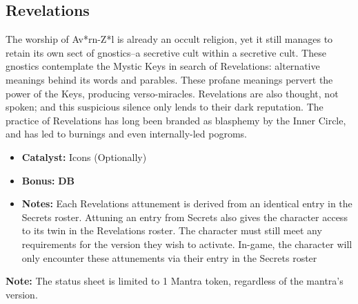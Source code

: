 \subsection{Revelations}
The worship of Av*rn-Z*l is already an occult religion, yet it still manages to retain its own sect of gnostics--a secretive cult within a secretive cult. These gnostics contemplate the Mystic Keys in search of Revelations: alternative meanings behind its words and parables. These profane meanings pervert the power of the Keys, producing verso-miracles. Revelations are also thought, not spoken; and this suspicious silence only lends to their dark reputation. The practice of Revelations has long been branded as blasphemy by the Inner Circle, and has led to burnings and even internally-led pogroms.

\begin{itemize}
\item \textbf{Catalyst:} Icons (Optionally)
\item \textbf{Bonus:} \textbf{DB}
\item \textbf{Notes:} Each Revelations attunement is derived from an identical entry in the Secrets roster. Attuning an entry from Secrets also gives the character access to its twin in the Revelations roster. The character must still meet any requirements for the version they wish to activate. In-game, the character will only encounter these attunements via their entry in the Secrets roster
\end{itemize}

\begin{tcolorbox}
\textbf{Note:} The status sheet is limited to 1 Mantra token, regardless of the mantra’s version.
\end{tcolorbox}

